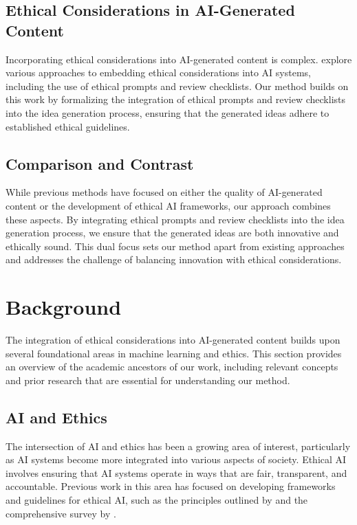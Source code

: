 \documentclass{article} %
\begin{document}
\subsection{Ethical Considerations in AI-Generated Content}
Incorporating ethical considerations into AI-generated content is complex. \citet{lu2024aiscientist} explore various approaches to embedding ethical considerations into AI systems, including the use of ethical prompts and review checklists. Our method builds on this work by formalizing the integration of ethical prompts and review checklists into the idea generation process, ensuring that the generated ideas adhere to established ethical guidelines.

\subsection{Comparison and Contrast}
While previous methods have focused on either the quality of AI-generated content or the development of ethical AI frameworks, our approach combines these aspects. By integrating ethical prompts and review checklists into the idea generation process, we ensure that the generated ideas are both innovative and ethically sound. This dual focus sets our method apart from existing approaches and addresses the challenge of balancing innovation with ethical considerations.

\section{Background}
\label{sec:background}

The integration of ethical considerations into AI-generated content builds upon several foundational areas in machine learning and ethics. This section provides an overview of the academic ancestors of our work, including relevant concepts and prior research that are essential for understanding our method.

\subsection{AI and Ethics}
The intersection of AI and ethics has been a growing area of interest, particularly as AI systems become more integrated into various aspects of society. Ethical AI involves ensuring that AI systems operate in ways that are fair, transparent, and accountable. Previous work in this area has focused on developing frameworks and guidelines for ethical AI, such as the principles outlined by \citet{goodfellow2016deep} and the comprehensive survey by \citet{yang2023diffusion}.
\end{document}
